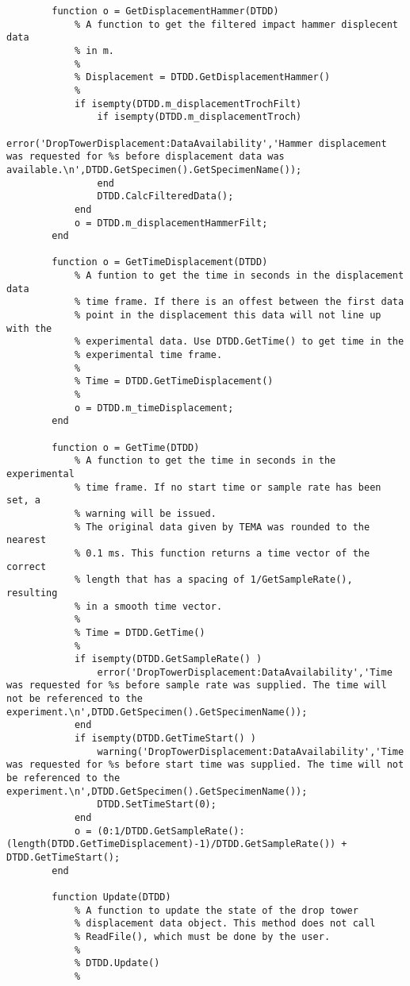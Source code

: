 \begin{lstlisting}
        function o = GetDisplacementHammer(DTDD)
            % A function to get the filtered impact hammer displecent data
            % in m.
            %
            % Displacement = DTDD.GetDisplacementHammer()
            %
            if isempty(DTDD.m_displacementTrochFilt)
                if isempty(DTDD.m_displacementTroch)
                    error('DropTowerDisplacement:DataAvailability','Hammer displacement was requested for %s before displacement data was available.\n',DTDD.GetSpecimen().GetSpecimenName());
                end
                DTDD.CalcFilteredData();
            end
            o = DTDD.m_displacementHammerFilt;
        end
        
        function o = GetTimeDisplacement(DTDD)
            % A funtion to get the time in seconds in the displacement data
            % time frame. If there is an offest between the first data
            % point in the displacement this data will not line up with the
            % experimental data. Use DTDD.GetTime() to get time in the
            % experimental time frame.
            %
            % Time = DTDD.GetTimeDisplacement()
            %
            o = DTDD.m_timeDisplacement;
        end
        
        function o = GetTime(DTDD)
            % A function to get the time in seconds in the experimental
            % time frame. If no start time or sample rate has been set, a 
            % warning will be issued. 
            % The original data given by TEMA was rounded to the nearest
            % 0.1 ms. This function returns a time vector of the correct
            % length that has a spacing of 1/GetSampleRate(), resulting
            % in a smooth time vector.
            %
            % Time = DTDD.GetTime()
            %
            if isempty(DTDD.GetSampleRate() )
                error('DropTowerDisplacement:DataAvailability','Time was requested for %s before sample rate was supplied. The time will not be referenced to the experiment.\n',DTDD.GetSpecimen().GetSpecimenName());
            end
            if isempty(DTDD.GetTimeStart() )
                warning('DropTowerDisplacement:DataAvailability','Time was requested for %s before start time was supplied. The time will not be referenced to the experiment.\n',DTDD.GetSpecimen().GetSpecimenName());
                DTDD.SetTimeStart(0);
            end
            o = (0:1/DTDD.GetSampleRate():(length(DTDD.GetTimeDisplacement)-1)/DTDD.GetSampleRate()) + DTDD.GetTimeStart();
        end
        
        function Update(DTDD)
            % A function to update the state of the drop tower 
            % displacement data object. This method does not call 
            % ReadFile(), which must be done by the user.
            %
            % DTDD.Update()
            %
            

\end{lstlisting}
